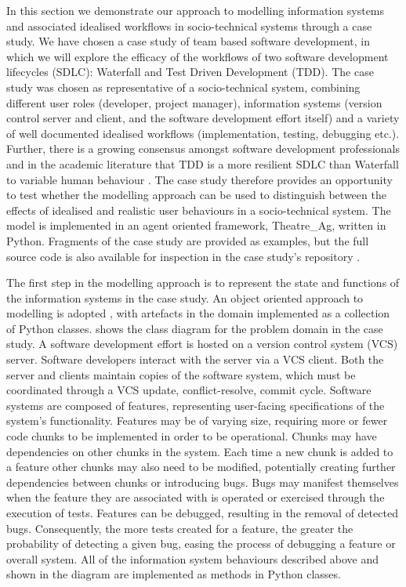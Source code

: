 \documentclass{llncs}
\begin{document}
In this section we demonstrate our approach to modelling information systems and associated idealised workflows in
socio-technical systems through a case study.  We have chosen a case study of team based software development, in which
we will explore the efficacy of the workflows of two software development lifecycles (SDLC): Waterfall and Test Driven
Development (TDD).  The case study was chosen as representative of a socio-technical system, combining different user
roles (developer, project manager), information systems (version control server and client, and the software development
effort itself) and a variety of well documented idealised workflows (implementation, testing, debugging etc.).  Further,
there is a growing consensus amongst software development professionals and in the academic literature that TDD is a
more resilient SDLC than Waterfall to variable human behaviour
\citep{Bhat2006TestDrivenDevelopment,George2004TestDrivenDevelopment,Huang2009EmpiricalTestFirstProgramming}.  The case
study therefore provides an opportunity to test whether the modelling approach can be used to distinguish between the
effects of idealised and realistic user behaviours in a socio-technical system.  The model is implemented in an agent
oriented framework, Theatre\_Ag, written in Python.  Fragments of the case study are provided as examples, but the full
source code is also available for inspection in the case study's repository \cite{storer2016softdev-workflow-scm}.

The first step in the modelling approach is to represent the state and functions of the information systems in the case
study. An object oriented approach to modelling is adopted \cite{omg07omguml}, with artefacts in the domain implemented
as a collection of Python classes.   shows the class diagram for the problem domain in the case study.
A software development effort is hosted on a version control system (VCS) server.  Software developers interact with the
server via a VCS client.  Both the server and clients maintain copies of the software system, which must be coordinated
through a VCS update, conflict-resolve, commit cycle.  Software systems are composed of features, representing
user-facing specifications of the system's functionality.  Features may be of varying size, requiring more or fewer code
chunks to be implemented in order to be operational.  Chunks may have dependencies on other chunks in the system.  Each
time a new chunk is added to a feature other chunks may also need to be modified, potentially creating further
dependencies between chunks or introducing bugs.  Bugs may manifest themselves when the feature they are associated with
is operated or exercised through the execution of tests.  Features can be debugged, resulting in the removal of detected
bugs.  Consequently, the more tests created for a feature, the greater the probability of detecting a given bug, easing
the process of debugging a feature or overall system. All of the information system behaviours described above and shown
in the diagram are implemented as methods in Python classes.
\end{document}
